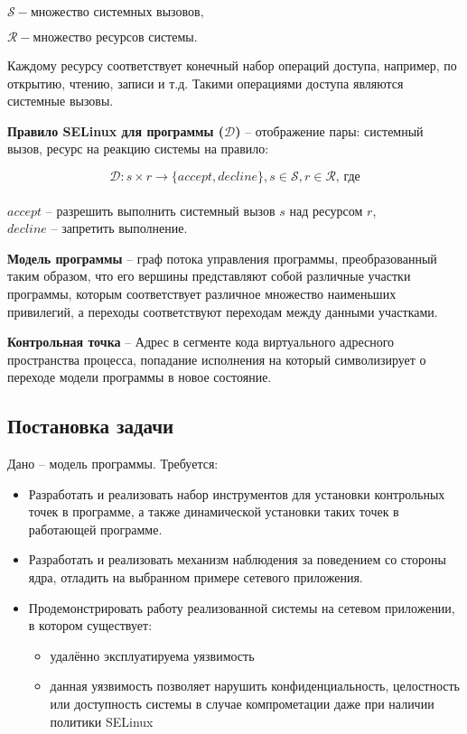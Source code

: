 $\mathcal{S} - \text{множество системных вызовов,}$

$\mathcal{R} - \text{множество ресурсов системы.}$

Каждому ресурсу  соответствует конечный набор операций доступа, 
например, по открытию, чтению, записи и т.д. Такими операциями
доступа являются системные вызовы.

\textbf{Правило  SELinux для программы ($\mathcal{D}$)} -- отображение пары: системный вызов, ресурс на реакцию системы на правило:

$$\mathcal{D}: s \times r \to \{accept, decline\}, s \in \mathcal{S}, r \in \mathcal{R} \text{, где} $$\\
$accept$ -- разрешить выполнить системный вызов $s$ над ресурсом $r$,\\
$decline$ -- запретить выполнение.

\textbf{Модель программы} -- граф потока управления программы,
преобразованный таким образом, что его вершины представляют собой
различные участки программы, которым соответствует различное множество
наименьших привилегий, а переходы соответствуют переходам между данными
участками.

\textbf{Контрольная точка} -- Адрес в сегменте кода виртуального адресного
пространства процесса, попадание исполнения на который символизирует о
переходе модели программы в новое состояние.

\subsection{Постановка задачи}

Дано -- модель программы. Требуется:

\begin{itemize}
\item Разработать и реализовать набор инструментов для установки
контрольных точек в программе, а также динамической установки таких
точек в работающей программе.
\begin{comment}
\item Выбрать пример сетевого приложения, в котором: а) есть удалённо
эксплуатируемая уязвимость, б) данная уязвимость позволяет нарушить
конфиденциальность, целостность или доступность системы в случае
компрометации даже при наличии политики SELinux (контрпример к SELinux).
Показать, как можно расставить контрольные точки в данном приложении,
чтобы ущерб от атаки был минимальным.
\end{comment}
\item Разработать и реализовать механизм наблюдения за поведением со
стороны ядра, отладить на выбранном примере сетевого приложения.
\item Продемонстрировать работу реализованной системы на сетевом приложении,
    в котором существует:
    \begin{itemize}
    \item удалённо эксплуатируема уязвимость
    \item данная уязвимость позволяет нарушить конфиденциальность, целостность
        или доступность системы в случае компрометации даже при наличии политики
        SELinux
    \end{itemize}
\end{itemize}

